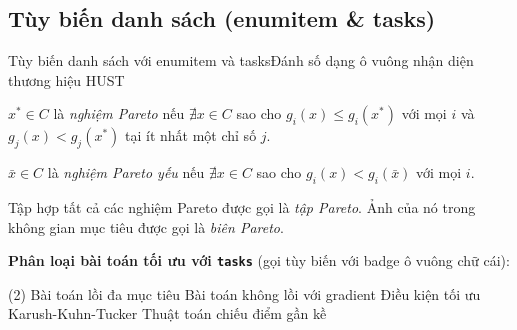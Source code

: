 \documentclass[aspectratio=43,10pt]{beamer}
\begin{document}
\subsection{Tùy biến danh sách (enumitem \& tasks)}
\begin{frame}[t]{Tùy biến danh sách với enumitem và tasks}{Đánh số dạng ô vuông nhận diện thương hiệu HUST}
  \small
  \begin{definition}
    \begin{hustsqlist}
      \item $x^* \in C$ là \emph{nghiệm Pareto} nếu $\nexists x \in C$ sao cho $g_i(x) \le g_i(x^*)$ với mọi $i$ và $g_j(x) < g_j(x^*)$ tại ít nhất một chỉ số $j$. \label{def:pareto}
      \item $\bar{x} \in C$ là \emph{nghiệm Pareto yếu} nếu $\nexists x \in C$ sao cho $g_i(x) < g_i(\bar{x})$ với mọi $i$.
      \item Tập hợp tất cả các nghiệm Pareto được gọi là \emph{tập Pareto}. Ảnh của nó trong không gian mục tiêu được gọi là \emph{biên Pareto}.
    \end{hustsqlist}
  \end{definition}
  \vskip 2pt
  \textbf{Phân loại bài toán tối ưu với \texttt{tasks}} (gọi tùy biến với badge ô vuông chữ cái):
  \begin{tasks}[label=\hustitemsq{\alph*}, label-width=18pt, item-indent=22pt, label-format={\bfseries\color{white}}](2)
    \task Bài toán lồi đa mục tiêu
    \task Bài toán không lồi với gradient
    \task Điều kiện tối ưu Karush-Kuhn-Tucker
    \task Thuật toán chiếu điểm gần kề
  \end{tasks}
\end{frame}
\end{document}
